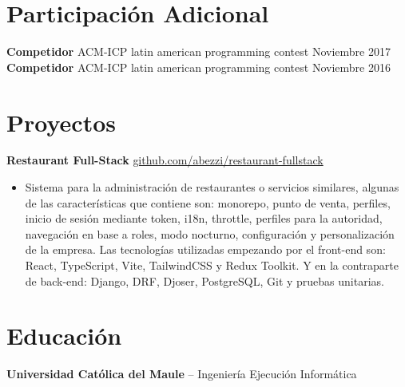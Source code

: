 \documentclass[11pt]{article}       %
\begin{document}
\section*{Participación Adicional}
\textbf{Competidor} {ACM-ICP latin american programming contest} \hfill Noviembre 2017 \\
\textbf{Competidor} {ACM-ICP latin american programming contest} \hfill Noviembre 2016 \\
\vspace{-9pt}

\section*{Proyectos}
\textbf{Restaurant Full-Stack} \hfill \href{https://github.com/Abezzi/restaurant-fullstack/}{github.com/abezzi/restaurant-fullstack} \\
\vspace{-9pt}
\begin{itemize}
  \item Sistema para la administración de restaurantes o servicios similares, algunas de las características que contiene son: monorepo, punto de venta, perfiles, inicio de sesión mediante token, i18n, throttle, perfiles para la autoridad, navegación en base a roles, modo nocturno, configuración y personalización de la empresa. Las tecnologías utilizadas empezando por el front-end son: React, TypeScript, Vite, TailwindCSS y Redux Toolkit. Y en la contraparte de back-end: Django, DRF, Djoser, PostgreSQL, Git y pruebas unitarias.
\end{itemize}

\vspace{-9pt}

\section*{Educación}
\textbf{Universidad Cat\'olica del Maule} -- Ingeniería Ejecución Informática \hfill \\
\end{document}
